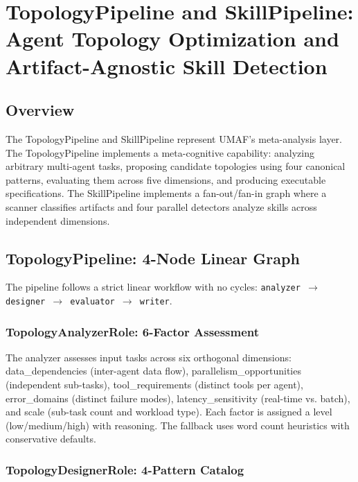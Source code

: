 \section{TopologyPipeline and SkillPipeline: Agent Topology Optimization and Artifact-Agnostic Skill Detection}
\label{sec:topology_skill}

\subsection{Overview}

The TopologyPipeline and SkillPipeline represent UMAF's meta-analysis layer. The TopologyPipeline implements a meta-cognitive capability: analyzing arbitrary multi-agent tasks, proposing candidate topologies using four canonical patterns, evaluating them across five dimensions, and producing executable specifications. The SkillPipeline implements a fan-out/fan-in graph where a scanner classifies artifacts and four parallel detectors analyze skills across independent dimensions.

\subsection{TopologyPipeline: 4-Node Linear Graph}

The pipeline follows a strict linear workflow with no cycles: \texttt{analyzer $\rightarrow$ designer $\rightarrow$ evaluator $\rightarrow$ writer}.

\subsubsection{TopologyAnalyzerRole: 6-Factor Assessment}

The analyzer assesses input tasks across six orthogonal dimensions: data\_dependencies (inter-agent data flow), parallelism\_opportunities (independent sub-tasks), tool\_requirements (distinct tools per agent), error\_domains (distinct failure modes), latency\_sensitivity (real-time vs. batch), and scale (sub-task count and workload type). Each factor is assigned a level (low/medium/high) with reasoning. The fallback uses word count heuristics with conservative defaults.

\subsubsection{TopologyDesignerRole: 4-Pattern Catalog}

